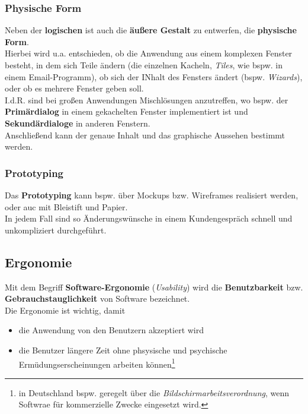 \subsubsection*{Physische Form}
Neben der \textbf{logischen} ist auch die \textbf{äußere Gestalt} zu entwerfen, die \textbf{physische Form}.\\
Hierbei wird u.a. entschieden, ob die Anwendung aus einem komplexen Fenster besteht, in dem sich Teile ändern (die einzelnen Kacheln, \textit{Tiles}, wie bspw. in einem Email-Programm), ob sich der INhalt des Fensters ändert (bspw. \textit{Wizards}), oder ob es mehrere Fenster geben soll.\\
I.d.R. sind bei großen Anwendungen Mischlösungen anzutreffen, wo bspw. der \textbf{Primärdialog} in einem gekachelten Fenster implementiert ist und \textbf{Sekundärdialoge} in anderen Fenstern.\\

\noindent
Anschließend kann der genaue Inhalt und das graphische Aussehen bestimmt werden.

\subsubsection*{Prototyping}
Das \textbf{Prototyping} kann bspw. über Mockups bzw. Wireframes realisiert werden, oder auc mit Bleistift und Papier.\\
In jedem Fall sind so Änderungswünsche in einem Kundengespräch schnell und unkompliziert durchgeführt.

\subsection{Ergonomie}
Mit dem Begriff \textbf{Software-Ergonomie} (\textit{Usability}) wird die \textbf{Benutzbarkeit} bzw. \textbf{Gebrauchstauglichkeit} von Software bezeichnet.\\

\noindent
Die Ergonomie ist wichtig, damit

\begin{itemize}
    \item die Anwendung von den Benutzern akzeptiert wird
    \item die Benutzer längere Zeit ohne phsysische und psychische Ermüdungserscheinungen arbeiten können\footnote{
    in Deutschland bspw. geregelt über die \textit{Bildschirmarbeitsverordnung}, wenn Softwrae für kommerzielle Zwecke eingesetzt wird.
    }
\end{itemize}

